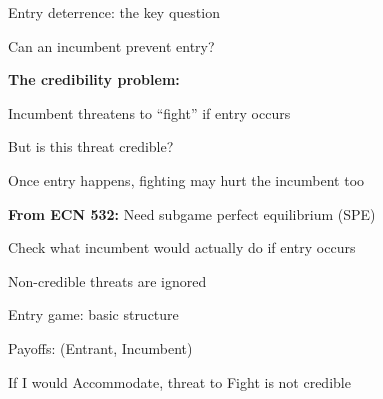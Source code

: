 \documentclass[notes,11pt, aspectratio=169]{beamer}
\newenvironment{wideitemize}{\itemize\addtolength{\itemsep}{10pt}}{\enditemize}
\begin{document}
\begin{frame}{Entry deterrence: the key question}
	\begin{wideitemize}
		\item Can an incumbent prevent entry?
		\item \textbf{The credibility problem:}
		\begin{wideitemize}
			\vspace{5pt}
			\item Incumbent threatens to ``fight'' if entry occurs
			\item But is this threat credible?
			\item Once entry happens, fighting may hurt the incumbent too
		\end{wideitemize}
		\item \textbf{From ECN 532:} Need subgame perfect equilibrium (SPE)
		\begin{wideitemize}
			\vspace{5pt}
			\item Check what incumbent would actually do if entry occurs
			\item Non-credible threats are ignored
		\end{wideitemize}
	\end{wideitemize}
\end{frame}

\begin{frame}{Entry game: basic structure}
	\begin{center}
	\end{center}
	\begin{wideitemize}
		\item Payoffs: (Entrant, Incumbent)
		\item If I would Accommodate, threat to Fight is not credible
	\end{wideitemize}
\end{frame}
\end{document}

